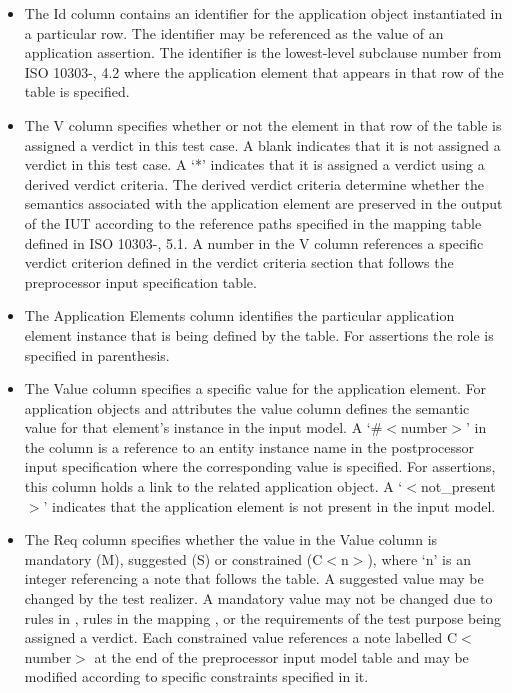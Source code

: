 \begin{itemize}
\item The Id column contains an identifier for the application object
      instantiated in a particular row. The identifier may be
      referenced as the value of an application assertion.
      The identifier is the lowest-level subclause number from
      ISO 10303-\theAPpartno, 4.2 where the application
      element that appears in that row of the table is specified.

\item The V column specifies whether or not the element in that
      row of the table is assigned a verdict in this test case.
      A blank indicates that it is not assigned a verdict in this test case.
      A `*' indicates that it is assigned a verdict
      using a derived verdict criteria. The derived verdict criteria
      determine whether the semantics associated with the application
      element are preserved in the output of the IUT according to
      the reference paths specified in the mapping table defined
      in ISO 10303-\theAPpartno, 5.1. A number in the V column references
      a specific verdict criterion defined in the verdict criteria
      section that follows the preprocessor input specification table.

\item The Application Elements column identifies the particular
      application element instance that is being
      defined by the table. For assertions the role is specified
      in parenthesis.

\item The Value column specifies a specific value for the application
      element. For application objects and attributes the value column
      defines the semantic value for that element's instance in the
      input model. A `\#$<$number$>$' in the column is a reference
      to an entity instance name in the postprocessor input specification
      where the corresponding value is specified. For assertions, this
      column holds a link to the related application object.
      A `$<$not\_present$>$' indicates that the
      application element is not present in the
      input model.

\item The Req column specifies whether the value in the Value column
      is mandatory (M), suggested (S) or constrained (C$<$n$>$), where `n'
      is an integer referencing a note that follows the table.
      A suggested value may be changed by the test realizer.
      A mandatory value may not be changed due to rules in \Express,
      rules in the mapping \maptableorspec, or the requirements of the test
      purpose being assigned a verdict. Each constrained value references
      a note labelled C$<$number$>$ at the end of the preprocessor
      input model table and may be modified according to specific
      constraints specified in it.
\end{itemize}

